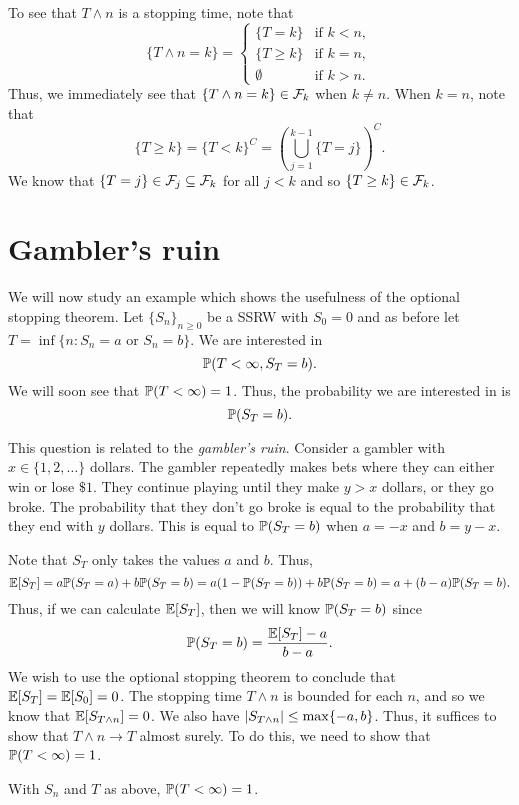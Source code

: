\begin{proposition}
    To see that $T \land n$ is a stopping time, note that
    \[\{T\land n = k\} =\begin{cases}
        \{T=k\} & \text{if } k < n,\\
        \{T \ge k\} & \text{if } k = n,\\
        \emptyset & \text{if } k  > n.
    \end{cases} \]
    Thus, we immediately see that $\{T \land n = k \} \in {\mathcal{F}}_k$ when $k \neq n$. When $k = n$, note that
    \[\{T \ge k \} = \{T < k\}^C = \left(\bigcup_{j=1}^{k-1}\{T =j\}\right)^C. \]
    We know that $\{T=j\} \in {\mathcal{F}}_j \subseteq {\mathcal{F}}_k$ for all $j < k$ and so $\{T \ge k \} \in {\mathcal{F}}_k$. 
\end{proposition}
\section{Gambler's ruin}
We will now study an example which shows the usefulness of the optional stopping theorem. Let $\{S_n\}_{n \ge 0}$ be a SSRW with $S_0 = 0$ and as before let $T=\inf \{n : S_n = a \text{ or } S_n = b\}$. We are interested in 
\[{\mathbb{P}}(T < \infty, S_T = b). \]
We will soon see that ${\mathbb{P}}(T < \infty) =1$. Thus, the probability we are interested in is
\[{\mathbb{P}}(S_T = b). \]
\begin{remark}
    This question is related to the \emph{gambler's ruin}. Consider a gambler with $x \in \{1,2,\ldots\}$ dollars. The gambler repeatedly makes bets where they can either win or lose $\$1$. They continue playing until they make $y > x$ dollars, or they go broke. The probability that they don't go broke is equal to the probability that they end with $y$ dollars. This is equal to ${\mathbb{P}}(S_T = b)$ when $a = -x$ and $b = y-x$.
\end{remark}
Note that $S_T$ only takes the values $a$ and $b$. Thus,
\[{\mathbb{E}}[S_T] = a{\mathbb{P}}(S_T=a)+b{\mathbb{P}}(S_T=b)=a(1-{\mathbb{P}}(S_T=b)) + b{\mathbb{P}}(S_T=b)= a+(b-a){\mathbb{P}}(S_T=b). \]
Thus, if we can calculate ${\mathbb{E}}[S_T]$, then we will know ${\mathbb{P}}(S_T=b)$ since 
\[{\mathbb{P}}(S_T=b) = \frac{{\mathbb{E}}[S_T]-a}{b-a}.\]
We wish to use the optional stopping theorem to conclude that ${\mathbb{E}}[S_T]={\mathbb{E}}[S_0]=0$. The stopping time $T \land n$ is bounded for each $n$, and so we know that ${\mathbb{E}}[S_{T \land n}] = 0$. We also have ${\left\lvert S_{T \land n}\right\rvert}\le \max\{-a,b\}$. Thus, it suffices to show that $T\land n \to T$ almost surely. To do this, we need to show that ${\mathbb{P}}(T < \infty) = 1$.
\begin{proposition}
    With $S_n$ and $T$ as above, ${\mathbb{P}}(T < \infty) =1$.
\end{proposition}
